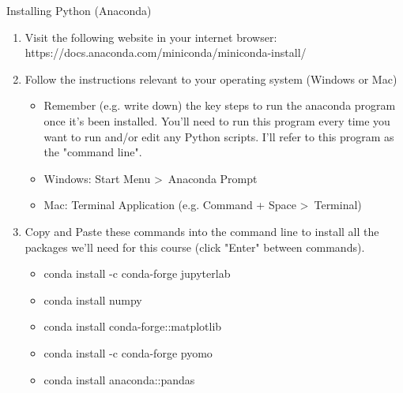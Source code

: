 \documentclass[10pt, aspectratio=169]{beamer}
\begin{document}
\begin{frame}{Installing Python (Anaconda)}
    \begin{enumerate}
        \item Visit the following website in your internet browser: https://docs.anaconda.com/miniconda/miniconda-install/
        \item Follow the instructions relevant to your operating system (Windows or Mac)
        \begin{itemize}
            \item Remember (e.g. write down) the key steps to run the anaconda program once it's been installed. You'll need to run this program every time you want to run and/or edit any Python scripts. I'll refer to this program as the "command line".
            \item Windows: Start Menu \textgreater\ Anaconda Prompt
            \item Mac: Terminal Application (e.g. Command + Space \textgreater\ Terminal)
        \end{itemize}
        \item Copy and Paste these commands into the command line to install all the packages we'll need for this course (click "Enter" between commands).
        \begin{itemize}
            \item conda install -c conda-forge jupyterlab
            \item conda install numpy
            \item conda install conda-forge::matplotlib
            \item conda install -c conda-forge pyomo
            \item conda install anaconda::pandas
        \end{itemize}
    \end{enumerate}
\end{frame}
\end{document}
